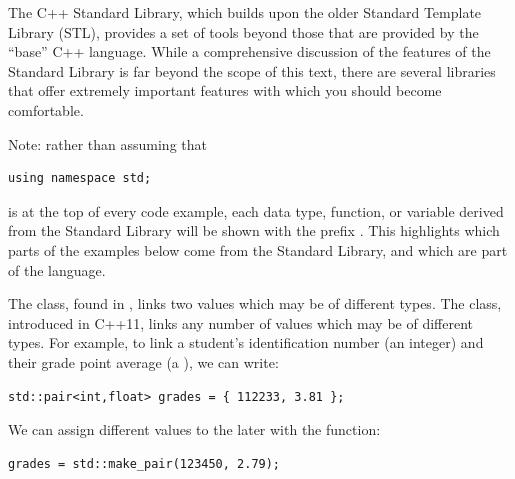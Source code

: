 
The C++ Standard Library, which builds upon the older Standard Template Library (STL), provides a set of tools beyond those that are provided by the ``base'' C++ language. 
While a comprehensive discussion of the features of the Standard Library is far beyond the scope of this text, there are several libraries that offer extremely important features with which you should become comfortable. 

\noindent Note: rather than assuming that 

\noindent\begin{minipage}{\linewidth}\begin{lstlisting}
using namespace std;
\end{lstlisting}\end{minipage}

\noindent is at the top of every code example, each data type, function, or variable derived from the Standard Library will be shown with the prefix . 
This highlights which parts of the examples below come from the Standard Library, and which are part of the language.


The  class, found in , links two values which may be of different types. 
The  class, introduced in C++11, links any number of values which may be of different types. 
For example, to link a student's identification number (an integer) and their grade point average (a ), we can write:

\noindent\begin{minipage}{\linewidth}\begin{lstlisting}
std::pair<int,float> grades = { 112233, 3.81 };
\end{lstlisting}\end{minipage}

\noindent We can assign different values to the  later with the  function: \nopagebreak[4]

\noindent\begin{minipage}{\linewidth}\begin{lstlisting}
grades = std::make_pair(123450, 2.79);
\end{lstlisting}\end{minipage}

